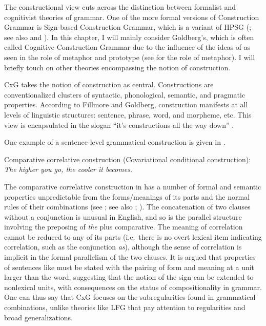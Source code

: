 \documentclass[output=paper,japanesefont,hidelinks]{langscibook}
\begin{document}
The constructional view cuts across the distinction between formalist and cognitivist theories of grammar. One of the more formal versions of Construction Grammar is Sign-based Construction Grammar, which is a variant of HPSG (\citealt{pollard1994head-driven}; see also \citealt{Sag2010b} and \citealt{MuellerCxG}). In this chapter, I will mainly consider Goldberg's, which is often called Cognitive Construction Grammar \citep[214]{Goldberg2006} due to the influence of the ideas of \citet{Lakoff1987} as seen in the role of metaphor and prototype (see  for the role of metaphor). I will briefly touch on other theories encompassing the notion of construction.

CxG takes the notion of construction as central. Constructions are conventionalized clusters of syntactic, phonological, semantic, and pragmatic properties. According to Fillmore and Goldberg, construction manifests at all levels of linguistic structures: sentence, phrase, word, and morpheme, etc. This view is encapsulated in the slogan ``it's constructions all the way down'' \citep[18]{Goldberg2006}.

One example of a sentence-level grammatical construction is given in .\largerpage

\ea%
    \label{ex:cg:1}
          Comparative correlative construction (Covariational conditional construction):\\
\textit{The higher you go, the cooler it becomes.}
    \z



The comparative correlative construction in  has a number of formal and semantic properties unpredictable from the forms/meanings of its parts and the normal rules of their combinations (see \citealt[6]{Goldberg2006}; see also \citealt{culicover2005simpler}; \citealt{Hoffmann2019}). The concatenation of two clauses without a conjunction is unusual in English, and so is the parallel structure involving the preposing of \textit{the} plus comparative. The meaning of correlation cannot be reduced to any of its parts (i.e.\ there is no overt lexical item indicating correlation, such as the conjunction \textit{as}), although the sense of correlation is implicit in the formal parallelism of the two clauses. It is argued that properties of sentences like  must be stated with the pairing of form and meaning at a unit larger than the word, suggesting that the notion of the sign can be extended to nonlexical units, with consequences on the status of compositionality in grammar. One can thus say that CxG focuses on the subregularities found in grammatical combinations, unlike theories like LFG that pay attention to regularities and broad generalizations. 
\end{document}
